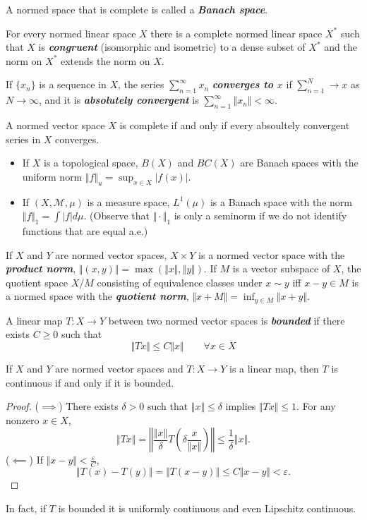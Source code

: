 \documentclass{article}
\theoremstyle{definition}
\numberwithin{equation}{section}
\begin{document}
	A normed space that is complete is called a \textbf{\textit{Banach space}}.
	\begin{thm}
		For every normed linear space $X$ there is a complete normed linear space $X^*$ such that $X$ is \textbf{\textit{congruent}} (isomorphic and isometric) to a dense subset of $X^*$ and the norm on $X^*$ extends the norm on $X$.
	\end{thm}
	If $\{x_n\}$ is a sequence in $X$, the series $\sum_{n=1}^\infty x_n$ \textbf{\textit{converges to $x$}} if $\sum_{n=1}^N\to x$ as $N\to \infty$, and it is \textbf{\textit{absolutely convergent}} is $\sum_{n=1}^\infty\Vert x_n\Vert<\infty$.
	\begin{thm}
		A normed vector space $X$ is complete if and only if every absoultely convergent series in $X$ converges.
	\end{thm}
	
	\begin{examples}\leavevmode
		\begin{itemize}
			\item If $X$ is a topological space, $B(X)$ and $BC(X)$ are Banach spaces with the uniform norm $\Vert f\Vert_u=\sup_{x\in X}|f(x)|$.
			\item If $(X,\mathcal{M},\mu)$ is a measure space, $L^1(\mu)$ is a Banach space with the norm $\Vert f\Vert_1=\int|f|d\mu$. (Observe that $\Vert\cdot\Vert_1$ is only a seminorm if we do not identify functions that are equal a.e.)
		\end{itemize}
	\end{examples}
	If $X$ and $Y$ are normed vector spaces, $X\times Y$ is a normed vector space with the \textbf{\textit{product norm}}, $\Vert(x,y)\Vert=\max(\Vert x\Vert,\Vert y\Vert)$.  If $M$ is a vector subspace of $X$, the quotient space $X/M$ consisting of equivalence classes under $x\sim y$ iff $x-y\in M$ is a normed space with the \textbf{\textit{quotient norm}}, $\Vert x+M\Vert=\inf_{y\in M}\Vert x+y\Vert$.
	
	A linear map $T:X\to Y$ between two normed vector spaces is \textbf{\textit{bounded}} if there exists $C\geq0$ such that
	\[\Vert Tx\Vert\leq C\Vert x\Vert\qquad \forall x\in X\]
	\begin{prop}
		If $X$ and $Y$ are normed vector spaces and $T:X\to Y$ is a linear map, then $T$ is continuous if and only if it is bounded.
	\end{prop}
	\begin{proof}
		($\implies $) There exists $\delta>0$ such that $\Vert x\Vert\leq\delta$ implies $\Vert Tx\Vert\leq1$. For any nonzero $x\in X$,
		\[\Vert Tx\Vert=\left\Vert \frac{\Vert x\Vert}{\delta}T\left(\delta\frac{x}{\Vert x\Vert}\right)\right\Vert\leq\frac{1}{\delta} \Vert x\Vert.\]
		($\impliedby$) If $\Vert x-y\Vert<\frac{\varepsilon}{C}$,
		\[\Vert T(x)-T(y)\Vert=\Vert T(x-y)\Vert\leq C\Vert x-y\Vert<\varepsilon.\]
	\end{proof}
	In fact, if $T$ is bounded it is uniformly continuous and even Lipschitz continuous.
	
\end{document}
